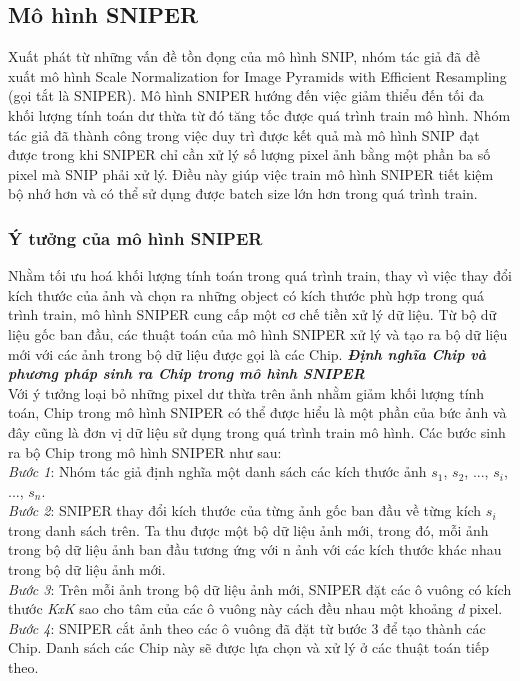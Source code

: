 {    \subsection{Mô hình SNIPER}
    Xuất phát từ những vấn đề tồn đọng của mô hình SNIP, nhóm tác giả \cite{singh2018sniper} đã đề xuất mô hình Scale Normalization for Image Pyramids with Efficient Resampling (gọi tắt là SNIPER).
    Mô hình SNIPER hướng đến việc giảm thiểu đến tối đa khối lượng tính toán dư thừa từ đó tăng tốc được quá trình train mô hình.
    Nhóm tác giả đã thành công trong việc duy trì được kết quả mà mô hình SNIP đạt được trong khi SNIPER chỉ cần xử lý số lượng pixel ảnh bằng một phần ba số pixel mà SNIP phải xử lý.
    Điều này giúp việc train mô hình SNIPER tiết kiệm bộ nhớ hơn và có thể sử dụng được batch size lớn hơn trong quá trình train.
    \subsubsection{Ý tưởng của mô hình SNIPER}
    Nhằm tối ưu hoá khối lượng tính toán trong quá trình train, thay vì việc thay đổi kích thước của ảnh và chọn ra những object có kích thước phù hợp trong quá trình train, mô hình SNIPER cung cấp một cơ chế tiền xử lý dữ liệu.
    Từ bộ dữ liệu gốc ban đầu, các thuật toán của mô hình SNIPER xử lý và tạo ra bộ dữ liệu mới với các ảnh trong bộ dữ liệu được gọi là các Chip.
    \textbf{\textit{Định nghĩa Chip và phương pháp sinh ra Chip trong mô hình SNIPER}} \\
    Với ý tưởng loại bỏ những pixel dư thừa trên ảnh nhằm giảm khối lượng tính toán, Chip trong mô hình SNIPER có thể được hiểu là một phần của bức ảnh và đây cũng là đơn vị dữ liệu sử dụng trong quá trình train mô hình.
    Các bước sinh ra bộ Chip trong mô hình SNIPER như sau: \\
    \textit{Bước 1}: Nhóm tác giả định nghĩa một danh sách các kích thước ảnh {${s}_{1}$, ${s}_{2}$, ..., ${s}_{i}$, ..., ${s}_{n}$}. \\
    \textit{Bước 2}: SNIPER thay đổi kích thước của từng ảnh gốc ban đầu về từng kích ${s}_{i}$ trong danh sách trên.
    Ta thu được một bộ dữ liệu ảnh mới, trong đó, mỗi ảnh trong bộ dữ liệu ảnh ban đầu tương ứng với n ảnh với các kích thước khác nhau trong bộ dữ liệu ảnh mới. \\
    \textit{Bước 3}: Trên mỗi ảnh trong bộ dữ liệu ảnh mới, SNIPER đặt các ô vuông có kích thước \textit{KxK} sao cho tâm của các ô vuông này cách đều nhau một khoảng \textit{d} pixel. \\
    \textit{Bước 4}: SNIPER cắt ảnh theo các ô vuông đã đặt từ bước 3 để tạo thành các Chip. Danh sách các Chip này sẽ được lựa chọn và xử lý ở các thuật toán tiếp theo. \\

}
